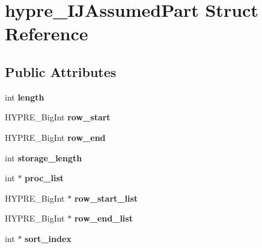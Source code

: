 \hypertarget{structhypre__IJAssumedPart}{}\section{hypre\+\_\+\+I\+J\+Assumed\+Part Struct Reference}
\label{structhypre__IJAssumedPart}
\subsection*{Public Attributes}
\begin{DoxyCompactItemize}
\item 
\hypertarget{structhypre__IJAssumedPart_ab381f39f5e9d7565f20bbf7fb7b1da95}{}int {\bfseries length}\label{structhypre__IJAssumedPart_ab381f39f5e9d7565f20bbf7fb7b1da95}

\item 
\hypertarget{structhypre__IJAssumedPart_a41137abf0eb9023d8e21677580e246fa}{}H\+Y\+P\+R\+E\+\_\+\+Big\+Int {\bfseries row\+\_\+start}\label{structhypre__IJAssumedPart_a41137abf0eb9023d8e21677580e246fa}

\item 
\hypertarget{structhypre__IJAssumedPart_a0fd0262f8555cd584c5a3e39affdabec}{}H\+Y\+P\+R\+E\+\_\+\+Big\+Int {\bfseries row\+\_\+end}\label{structhypre__IJAssumedPart_a0fd0262f8555cd584c5a3e39affdabec}

\item 
\hypertarget{structhypre__IJAssumedPart_a251da2243fbc440896aa23b549db97b4}{}int {\bfseries storage\+\_\+length}\label{structhypre__IJAssumedPart_a251da2243fbc440896aa23b549db97b4}

\item 
\hypertarget{structhypre__IJAssumedPart_ac4698b8defe1ff01cebeae4dac70cc84}{}int $\ast$ {\bfseries proc\+\_\+list}\label{structhypre__IJAssumedPart_ac4698b8defe1ff01cebeae4dac70cc84}

\item 
\hypertarget{structhypre__IJAssumedPart_a343d3037bc4ac5edafa4c300729ff8e4}{}H\+Y\+P\+R\+E\+\_\+\+Big\+Int $\ast$ {\bfseries row\+\_\+start\+\_\+list}\label{structhypre__IJAssumedPart_a343d3037bc4ac5edafa4c300729ff8e4}

\item 
\hypertarget{structhypre__IJAssumedPart_ac2f099e4295e2acd0bdc3b0b59fe657e}{}H\+Y\+P\+R\+E\+\_\+\+Big\+Int $\ast$ {\bfseries row\+\_\+end\+\_\+list}\label{structhypre__IJAssumedPart_ac2f099e4295e2acd0bdc3b0b59fe657e}

\item 
\hypertarget{structhypre__IJAssumedPart_ad1ebbbd4502ca24b540ae0e86b60b491}{}int $\ast$ {\bfseries sort\+\_\+index}\label{structhypre__IJAssumedPart_ad1ebbbd4502ca24b540ae0e86b60b491}

\end{DoxyCompactItemize}


